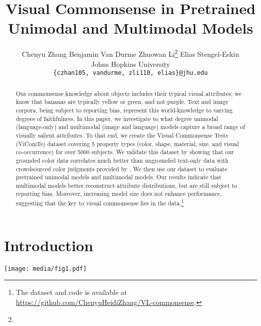 \documentclass[11pt]{article}
\author{Chenyu Zhang \qquad 
        Benjamin Van Durme \qquad
        Zhuowan Li\footnotemark[1]
\thanks{\llap{\textsuperscript{*}}{Joint Advising}} 
        \qquad 
        Elias Stengel-Eskin\footnotemark[1] \\
  Johns Hopkins University \\
\texttt{\{czhan105, vandurme,  zli110, elias\}@jhu.edu}}
\title{Visual Commonsense in Pretrained Unimodal and Multimodal Models}
\newcommand{\dataset}{ViComTe}
\begin{document}
\maketitle
\begin{abstract}
Our commonsense knowledge about objects includes their typical visual attributes; we know that bananas are typically yellow or green, and not purple.
Text and image corpora, being subject to reporting bias, represent this world-knowledge to varying degrees of faithfulness.  
In this paper, we investigate to what degree unimodal (language-only) and multimodal (image and language) models capture a broad range of visually salient attributes. 
To that end, we create the 
Visual Commonsense Tests (\dataset) dataset
covering 5 property types (color, shape, material, size, and visual co-occurrence) for over 5000 subjects.
We validate this dataset by showing that our grounded color data correlates much better than ungrounded text-only data with crowdsourced color judgments provided by \citet{paik-etal-2021-world}. 
We then use our dataset to evaluate pretrained unimodal models and multimodal models. 
Our results indicate that multimodal models better reconstruct attribute distributions, but are still subject to reporting bias. 
Moreover, increasing model size does not enhance performance, suggesting that the key to visual commonsense lies in the data.\footnote{The dataset and code is available at {\url{https://github.com/ChenyuHeidiZhang/VL-commonsense}}.}


\end{abstract}

\section{Introduction}

\begin{figure*}[ht]
    \centering
    \texttt{[image: media/fig1.pdf]}
    \caption{
We compare unimodal and multimodal models' abilities to capture visual commonsense knowledge. The commonsense knowledge is evaluated on five relation types: color, shape, material, size, and visual co-occurrence. We compare the model outputs with the gold distribution from \dataset, which is mined from Visual Genome. }
    \label{fig:fig1}
\vspace{-0.5em}
\end{figure*}
\end{document}
